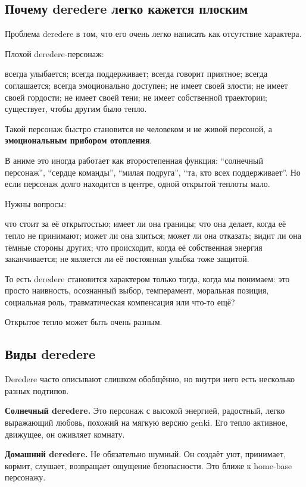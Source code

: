 \subsection*{Почему deredere легко кажется плоским}

Проблема deredere в том, что его очень легко написать как отсутствие
характера.

Плохой deredere-персонаж:

всегда улыбается; всегда поддерживает; всегда говорит приятное; всегда
соглашается; всегда эмоционально доступен; не имеет своей злости; не
имеет своей гордости; не имеет своей тени; не имеет собственной
траектории; существует, чтобы другим было тепло.

Такой персонаж быстро становится не человеком и не живой персоной, а
\textbf{эмоциональным прибором отопления}.

В аниме это иногда работает как второстепенная функция: ``солнечный
персонаж'', ``сердце команды'', ``милая подруга'', ``та, кто всех
поддерживает''. Но если персонаж долго находится в центре, одной
открытой теплоты мало.

Нужны вопросы:

что стоит за её открытостью; имеет ли она границы; что она делает, когда
её тепло не принимают; может ли она злиться; может ли она отказать;
видит ли она тёмные стороны других; что происходит, когда её собственная
энергия заканчивается; не является ли её постоянная улыбка тоже защитой.

То есть deredere становится характером только тогда, когда мы понимаем:
это просто наивность, осознанный выбор, темперамент, моральная позиция,
социальная роль, травматическая компенсация или что-то ещё?

Открытое тепло может быть очень разным.

\subsection*{Виды deredere}

Deredere часто описывают слишком обобщённо, но внутри него есть
несколько разных подтипов.

\textbf{Солнечный deredere.} Это персонаж с высокой энергией, радостный,
легко выражающий любовь, похожий на мягкую версию genki. Его тепло
активное, движущее, он оживляет комнату.

\textbf{Домашний deredere.} Не обязательно шумный. Он создаёт уют,
принимает, кормит, слушает, возвращает ощущение безопасности. Это ближе
к home-base персонажу.


